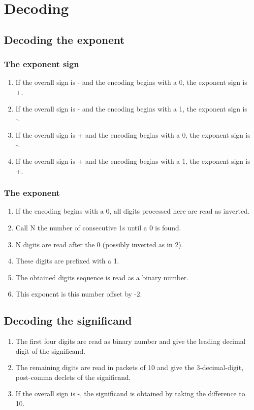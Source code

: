 \documentclass{acm_proc_article-sp}
\begin{document}
\section{Decoding}

\subsection{Decoding the exponent}

\subsubsection{The exponent sign}

\begin{enumerate}
\item If the overall sign is - and the encoding begins with a 0, the exponent sign is +.
\item If the overall sign is - and the encoding begins with a 1, the exponent sign is -.
\item If the overall sign is + and the encoding begins with a 0, the exponent sign is -.
\item If the overall sign is + and the encoding begins with a 1, the exponent sign is +.
\end{enumerate}

\subsubsection{The exponent}

\begin{enumerate}
\item If the encoding begins with a 0, all digits processed here are read as inverted.
\item  Call N the number of consecutive 1s until a 0 is found.
\item  N digits are read after the 0 (possibly inverted as in 2).
\item  These digits are prefixed with a 1.
\item  The obtained digits sequence is read as a binary number.
\item  This exponent is this number offset by -2.
\end{enumerate}

\subsection{Decoding the significand}
\begin{enumerate}
\item The first four digits are read as binary number and give the leading decimal digit of the significand.
\item The remaining digits are read in packets of 10 and give the 3-decimal-digit, post-comma declets of the significand.
\item If the overall sign is -, the significand is obtained by taking the difference to 10.
\end{enumerate}
\end{document}
